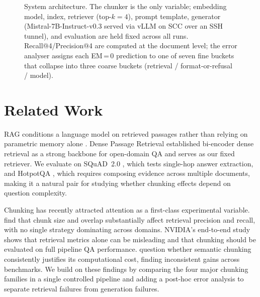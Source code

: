 \documentclass[11pt]{article}
\begin{document}
\begin{figure}[!t]
\caption{System architecture. The chunker is the only variable; embedding model,
index, retriever (top-$k{=}4$), prompt template, generator (Mistral-7B-Instruct-v0.3
served via vLLM on SCC over an SSH tunnel), and evaluation are held fixed across all
runs. Recall@4/Precision@4 are computed at the document level; the error analyser
assigns each EM\,=\,0 prediction to one of seven fine buckets that collapse into three
coarse buckets (retrieval / format-or-refusal / model).}
\label{fig:architecture}
\end{figure}

\section{Related Work}

RAG conditions a language model on retrieved passages rather than relying on parametric
memory alone \citep{lewis2020rag}. Dense Passage Retrieval \citep{karpukhin2020dpr}
established bi-encoder dense retrieval as a strong backbone for open-domain QA and
serves as our fixed retriever. We evaluate on SQuAD~2.0 \citep{rajpurkar2018squad2},
which tests single-hop answer extraction, and HotpotQA \citep{yang2018hotpotqa}, which
requires composing evidence across multiple documents, making it a natural pair for studying
whether chunking effects depend on question complexity.

Chunking has recently attracted attention as a first-class experimental variable.
\citet{smith2024chunking} find that chunk size and overlap substantially affect
retrieval precision and recall, with no single strategy dominating across domains.
NVIDIA's end-to-end study \citep{nvidia2024chunking} shows that retrieval metrics alone
can be misleading and that chunking should be evaluated on full pipeline QA performance.
\citet{qu2024semanticchunking} question whether semantic chunking consistently justifies
its computational cost, finding inconsistent gains across benchmarks. We build on these
findings by comparing the four major chunking families in a single controlled pipeline
and adding a post-hoc error analysis to separate retrieval failures from generation
failures.
\end{document}
